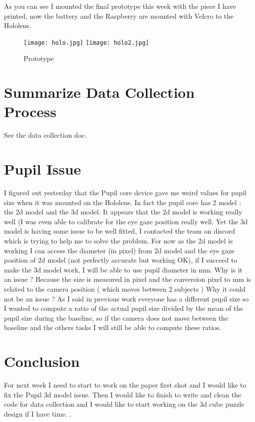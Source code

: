 \documentclass[11pt]{article}
\begin{document}
As you can see I mounted the final prototype this week with the piece I have printed, now the battery and the Raspberry are mounted with Velcro to the Hololens.

\begin{figure}[H]
    \centering
    \texttt{[image: holo.jpg]}
    \texttt{[image: holo2.jpg]}
    \caption{Prototype} 
    \label{fig:img1}
\end{figure}


\section{Summarize Data Collection Process}

See the data collection doc.

\newpage
\section{Pupil Issue}
\newline
I figured out yesterday that the Pupil core device gave me weird values for pupil size when it was mounted on the Hololens. In fact the pupil core has 2 model : the 2d model and the 3d model. It appears that the 2d model is working really well (I was even able to calibrate for the eye gaze position really well. Yet the 3d model is having some issue to be well fitted, I contacted the team on discord which is trying to help me to solve the problem. For now as the 2d model is working I can access the diameter (in pixel) from 2d model and the eye gaze position of 2d model (not perfectly accurate but working OK), if I succeed to make the 3d model work, I will be able to use pupil diameter in mm.
\newline
Why is it an issue ? Because the size is measured in pixel and the conversion pixel to mm is related to the camera position ( which moves between 2 subjects )
\newline
Why it could not be an issue ? As I said in previous work everyone has a different pupil size so I wanted to compute a ratio of the actual pupil size divided by the mean of the pupil size during the baseline, so if the camera does not move between the baseline and the others tasks I will still be able to compute these ratios.



\section{Conclusion}
For next week I need to start to work on the paper first shot and I would like to fix the Pupil 3d model issue. Then I would like to finish to write and clean the code for data collection and I would like to start working on the 3d cube puzzle design if I have time.
\medskip.
\printbibliography %
\end{document}
